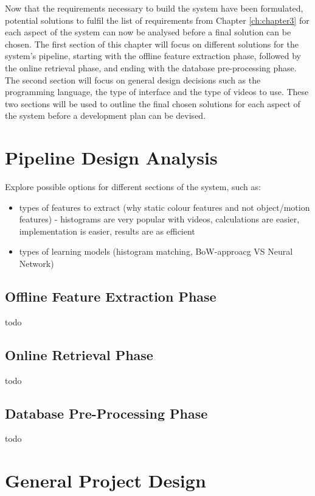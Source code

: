 Now that the requirements necessary to build the system have been formulated, potential solutions to fulfil the list of requirements from Chapter \ref{ch:chapter3} for each aspect of the system can now be analysed before a final solution can be chosen. The first section of this chapter will focus on different solutions for the system's pipeline, starting with the offline feature extraction phase, followed by the online retrieval phase, and ending with the database pre-processing phase. The second section will focus on general design decisions such as the programming language, the type of interface and the type of videos to use. These two sections will be used to outline the final chosen solutions for each aspect of the system before a development plan can be devised.

\section{Pipeline Design Analysis}

Explore possible options for different sections of the system, such as:
    \begin{itemize}
        \item types of features to extract (why static colour features and not object/motion features) - histograms are very popular with videos, calculations are easier, implementation is easier, results are as efficient
        \item types of learning models (histogram matching, BoW-approacg VS Neural Network)
    \end{itemize}

\subsection{Offline Feature Extraction Phase}

todo

\subsection{Online Retrieval Phase}

todo

\subsection{Database Pre-Processing Phase}

todo

\section{General Project Design}

